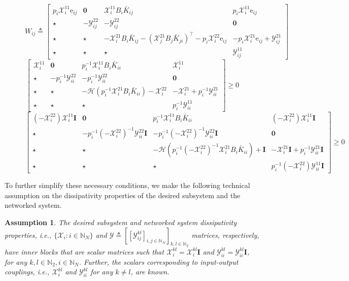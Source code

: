 \documentclass[letterpaper, 10 pt, conference]{ieeeconf}%
\newcommand{\N}{\mathbb{N}}
\newcommand{\T}{\top}
\newcommand{\I}{\mathbf{I}}
\newcommand{\0}{\mathbf{0}}
\newcommand{\X}{\mathcal{X}}
\newcommand{\Y}{\mathcal{Y}}
\newcommand{\x}{{\scriptstyle \X}}
\newcommand{\y}{{\scriptstyle \Y}}
\newcommand{\e}{\mathrm{e}}
\newcommand{\bm}[1]{\begin{bmatrix}#1\end{bmatrix}}
\newtheorem{assumption}{\textbf{Assumption}}
\begin{document}
\begin{figure}
\begin{equation}\label{Eq:NecessaryCondStep1}
W_{ij} \triangleq 
\bm{
p_i\X_i^{11}\e_{ij} & \0 & \X_i^{11} B_i \bar{K}_{ij} & p_i\X_i^{11}\e_{ij} \\
\star & -\Y^{22}_{ij} & -\Y^{22}_{ij} & \0 \\ 
\star& \star & -\X_i^{21}B_i\bar K_{ij}-(\X_j^{21}B_j\bar K_{ji})^\T-p_i\X_i^{22}\e_{ij} & -p_i\X_i^{21}\e_{ij}+\Y^{21}_{ij} \\
\star & \star & \star &  \Y^{11}_{ij}
}
\end{equation}
\begin{equation}\label{Eq:NecessaryCondStep2}
\bm{
\X_i^{11} & \0 & p_i^{-1}\X_i^{11} B_i \bar{K}_{ii} & \X_i^{11} \\
\star & -p_i^{-1}\Y^{22}_{ii} & -p_i^{-1}\Y^{22}_{ii} & \0 \\ 
\star& \star & -\mathcal{H}(p_i^{-1}\X^{21}_i B_i \bar{K}_{ii})-\X_i^{22} & -\X_i^{21}+ p_i^{-1} \Y^{21}_{ii} \\
\star & \star & \star &  p_i^{-1}\Y^{11}_{ii}
} \geq 0  
\end{equation} 
\begin{equation}\label{Eq:NecessaryCondStep3}
\bm{
(-\x_i^{22})\x_i^{11}\I & \0 & p_i^{-1}\x_i^{11}B_i \bar{K}_{ii} & (-\x_i^{22})\x_i^{11}\I \\
\star & -p_i^{-1}(-\x_i^{22})^{-1}\y^{22}_{ii}\I & -p_i^{-1}(-\x_i^{22})^{-1}\y^{22}_{ii}\I & \0 \\ 
\star& \star & -\mathcal{H}(p_i^{-1}(-\x_i^{22})^{-1}\x^{21}_i B_i \bar{K}_{ii}) + \I & -\x_i^{21}\I+ p_i^{-1}\y^{21}_{ii}\I \\
\star & \star & \star &  p_i^{-1}(-\x_i^{22})\y^{11}_{ii}\I
} \geq 0 
\end{equation}
\hrulefill
\end{figure}


To further simplify these necessary conditions, we make the following technical assumption on the dissipativity properties of the desired subsystem and the networked system.

\begin{assumption}\label{As:ScalarDissipativityMatrices}
The desired subsystem and networked system dissipativity properties, i.e., $\{\X_i: i\in\N_N\}$ and $\Y\triangleq[[\Y_{ij}^{kl}]_{i,j\in\N_N}]_{k,l\in\N_2}$ matrices, respectively, have inner blocks that are scalar matrices such that $\X_i^{kl} = \x_i^{kl}\I$ and $\Y_{ii}^{kl} = \y_{ii}^{kl}\I$, for any $k,l \in \N_2, i\in\N_N$. Further, the scalars corresponding to input-output couplings, i.e., $\x_i^{kl}$ and $\y_{ii}^{kl}$ for any $k \neq l$, are known. 
\end{assumption}
\end{document}
